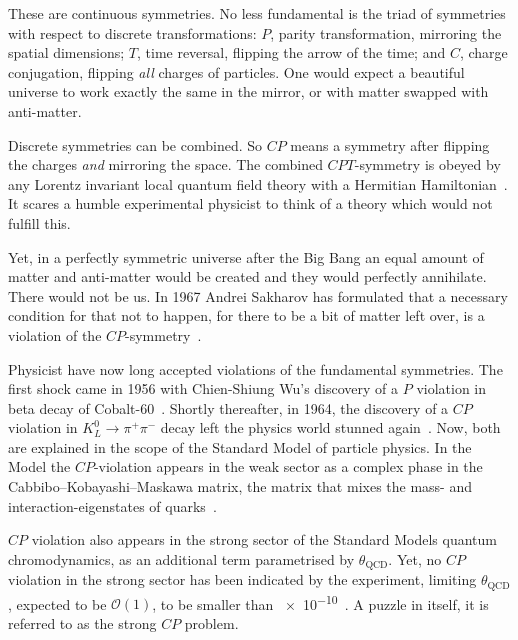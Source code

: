 These are continuous symmetries. No less fundamental is the triad of symmetries with respect to discrete transformations: $P$, parity transformation, mirroring the spatial dimensions; $T$, time reversal, flipping the arrow of the time; and $C$, charge conjugation, flipping \emph{all} charges of particles. One would expect a beautiful universe to work exactly the same in the mirror, or with matter swapped with anti-matter.

Discrete symmetries can be combined. So $CP$ means a symmetry after flipping the charges \emph{and} mirroring the space. The combined $CPT$-symmetry is obeyed by any Lorentz invariant local quantum field theory with a Hermitian Hamiltonian~\cite{Sachs1987}. It scares a humble experimental physicist to think of a theory which would not fulfill this.

Yet, in a perfectly symmetric universe after the Big Bang an equal amount of matter and anti-matter would be created and they would perfectly annihilate. There would not be us.
In 1967 Andrei Sakharov
has formulated that a necessary condition for that not to happen, for there to be a bit of matter left over, is a violation of the $CP$-symmetry~\cite{0038-5670-34-5-A08}.

Physicist have now long accepted violations of the fundamental symmetries.
The first shock came in 1956 with Chien-Shiung Wu's discovery of a $P$ violation in beta decay of Cobalt-60~\cite{PhysRev.105.1413}. Shortly thereafter, in 1964, the discovery of a $CP$ violation in $K^0_L \rightarrow \pi^+ \pi^-$ decay left the physics world stunned again~\cite{PhysRevLett.13.138}. Now, both are explained in the scope of the Standard Model of particle physics. In the Model the $CP$-violation appears in the weak sector as a complex phase in the Cabbibo--Kobayashi--Maskawa matrix, the matrix that mixes the mass- and interaction-eigenstates of quarks~\cite{doi:10.1143/PTP.49.652}.

$CP$ violation also appears in the strong sector of the Standard Models quantum chromodynamics, as an additional term parametrised by $\theta_\text{QCD}$. Yet, no $CP$ violation in the strong sector has been indicated by the experiment, limiting  $\theta_\text{QCD}$, expected to be $\mathcal{O}(1)$, to be smaller than \num{e-10}~\cite{PDG2016}. A puzzle in itself, it is referred to as the strong $CP$ problem.

